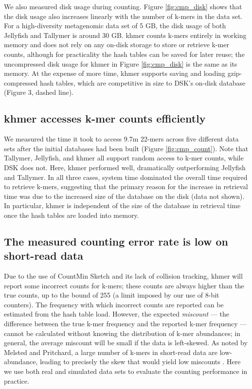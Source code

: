 \documentclass[10pt]{article}
\begin{document}
We also measured disk usage during counting.  Figure
\ref{fig:cmp_disk} shows that the disk usage also increases linearly
with the number of k-mers in the data set.  For a high-diversity
metagenomic data set of 5 GB, the disk usage of both Jellyfish and
Tallymer is around 30 GB.  khmer counts k-mers entirely in working
memory and does not rely on any on-disk storage to store or retrieve
k-mer counts, although for practicality the hash tables can be saved
for later reuse; the uncompressed disk usage for khmer in Figure
\ref{fig:cmp_disk} is the same as its memory.  At the expense of more
time, khmer supports saving and loading gzip-compressed hash tables,
which are competitive in size to DSK's on-disk database (Figure 3,
dashed line).

\subsection*{khmer accesses k-mer counts efficiently}

We measured the time it took to access 9.7m 22-mers across five
different data sets after the initial databases had been built (Figure
\ref{fig:cmp_count}).  Note that Tallymer, Jellyfish, and khmer all
support random access to k-mer counts, while DSK does not. Here, khmer
performed well, dramatically outperforming Jellyfish and Tallymer.  In
all three cases, system time dominated the overall time required to
retrieve k-mers, suggesting that the primary reason for the increase
in retrieval time was due to the increased size of the database on the
disk (data not shown).  In particular, khmer is independent of the
size of the database in retrieval time once the hash tables are loaded
into memory.

\subsection*{The measured counting error rate is low on short-read data}

Due to the use of CountMin Sketch and its lack of collision tracking,
khmer will report some incorrect counts for k-mers; these counts are
always higher than the true counts, up to the bound of 255 (a limit
imposed by our use of 8-bit counters). The frequency with which
incorrect counts are reported can be estimated from the hash table
load.  However, the expected {\em miscount} --- the difference between
the true k-mer frequency and the reported k-mer frequency --- cannot
be calculated without knowing the distribution of k-mer abundances; in
general, the average miscount will be small if the data is
left-skewed.  As noted by Melsted and Pritchard, a large number of
k-mers in short-read data are low-abundance, leading to precisely the
skew that would yield low miscounts \cite{Melsted2011}.  Here we use
both real and simulated data sets to evaluate the counting performance
in practice.
\end{document}
